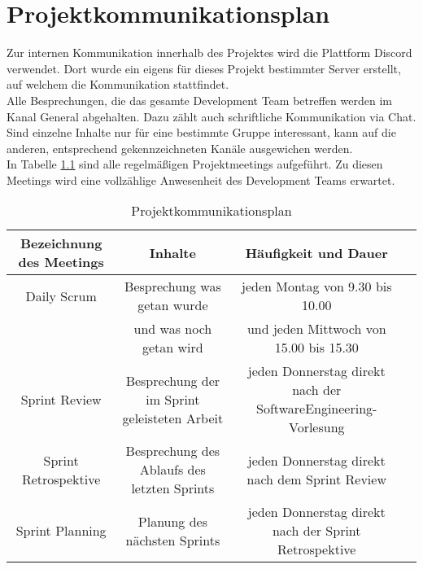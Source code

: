 \chapter{Projektkommunikationsplan}
Zur internen Kommunikation innerhalb des Projektes wird die Plattform Discord verwendet. Dort wurde ein eigens für dieses Projekt bestimmter Server erstellt, auf welchem die Kommunikation stattfindet. \\
Alle Besprechungen, die das gesamte \gls{Development Team} betreffen werden im Kanal \glqq General\grqq\: abgehalten. Dazu zählt auch schriftliche Kommunikation via Chat. \\
Sind einzelne Inhalte nur für eine bestimmte Gruppe interessant, kann auf die anderen, entsprechend gekennzeichneten Kanäle ausgewichen werden. \\
In Tabelle \ref{tab:Kommunikation} sind alle regelmäßigen Projektmeetings aufgeführt. Zu diesen Meetings wird eine vollzählige Anwesenheit des \gls{Development Team}s erwartet.

\begin{table}[h]
\centering
\tiny
\begin{tabular} [h] {|c|c|c|c|}
\hline
Bezeichnung des Meetings & Inhalte & Häufigkeit und Dauer \\
\hline
\gls{Daily Scrum} & Besprechung was getan wurde & jeden Montag von 9.30 bis 10.00\\
\quad & und was noch getan wird & und jeden Mittwoch von 15.00 bis 15.30 \\
\hline
\gls{Sprint Review} & Besprechung der im Sprint geleisteten Arbeit & jeden Donnerstag direkt nach der SoftwareEngineering-Vorlesung\\
\hline
\gls{Sprint Retrospektive} & Besprechung des Ablaufs des letzten Sprints & jeden Donnerstag direkt nach dem \gls{Sprint Review}\\
\hline
\gls{Sprint Planning} & Planung des nächsten Sprints & jeden Donnerstag direkt nach der \gls{Sprint Retrospektive}\\
\hline
\end{tabular}
\caption{Projektkommunikationsplan}
\label{tab:Kommunikation}
\end{table}
